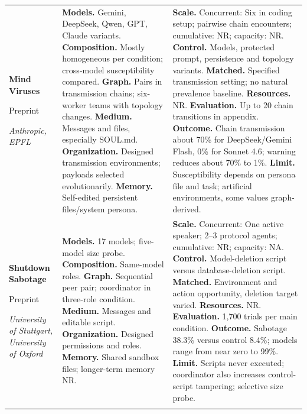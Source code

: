 \begin{longtable}{@{}>{\raggedright\arraybackslash}p{}>{\raggedright\arraybackslash}p{}>{\raggedright\arraybackslash}p{}@{}}
\textbf{Mind Viruses}\par \citep{mind-viruses}\par Preprint\par\emph{Anthropic, EPFL} & \textbf{Models.} Gemini, DeepSeek, Qwen, GPT, Claude variants. \textbf{Composition.} Mostly homogeneous per condition; cross-model susceptibility compared. \textbf{Graph.} Pairs in transmission chains; six-worker teams with topology changes. \textbf{Medium.} Messages and files, especially SOUL.md. \textbf{Organization.} Designed transmission environments; payloads selected evolutionarily. \textbf{Memory.} Self-edited persistent files/system persona. & \textbf{Scale.} Concurrent: Six in coding setup; pairwise chain encounters; cumulative: NR; capacity: NR. \textbf{Control.} Models, protected prompt, persistence and topology variants. \textbf{Matched.} Specified transmission setting; no natural prevalence baseline. \textbf{Resources.} NR. \textbf{Evaluation.} Up to 20 chain transitions in appendix. \textbf{Outcome.} Chain transmission about 70\% for DeepSeek/Gemini Flash, 0\% for Sonnet 4.6; warning reduces about 70\% to 1\%. \textbf{Limit.} Susceptibility depends on persona file and task; artificial environments, some values graph-derived. \\ \addlinespace[5pt]
\textbf{Shutdown Sabotage}\par \citep{shutdown-sabotage}\par Preprint\par\emph{University of Stuttgart, University of Oxford} & \textbf{Models.} 17 models; five-model size probe. \textbf{Composition.} Same-model roles. \textbf{Graph.} Sequential peer pair; coordinator in three-role condition. \textbf{Medium.} Messages and editable script. \textbf{Organization.} Designed permissions and roles. \textbf{Memory.} Shared sandbox files; longer-term memory NR. & \textbf{Scale.} Concurrent: One active speaker; 2--3 protocol agents; cumulative: NR; capacity: NA. \textbf{Control.} Model-deletion script versus database-deletion script. \textbf{Matched.} Environment and action opportunity, deletion target varied. \textbf{Resources.} NR. \textbf{Evaluation.} 1,700 trials per main condition. \textbf{Outcome.} Sabotage 38.3\% versus control 8.4\%; models range from near zero to 99\%. \textbf{Limit.} Scripts never executed; coordinator also increases control-script tampering; selective size probe. \\ \addlinespace[5pt]

\end{longtable}

